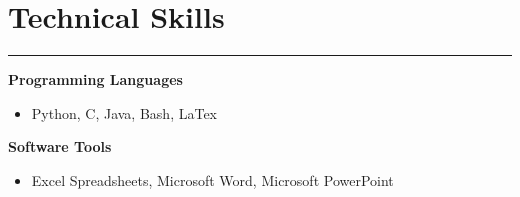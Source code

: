 \documentclass[a4paper,11pt]{article}
\begin{document}
\vspace{-0.5em}
\vspace{-0.5em}
\section*{Technical Skills}
\vspace{-0.8em}
\rule{\linewidth}{2pt}
\textbf{Programming Languages}
\vspace{-0.8em}
\begin{itemize}
    \item Python, C, Java, Bash, LaTex
\end{itemize}
\vspace{-0.8em}
\textbf{Software Tools}
\vspace{-0.8em}
\begin{itemize}
    \item Excel Spreadsheets, Microsoft Word, Microsoft PowerPoint
\end{itemize}
\end{document}
